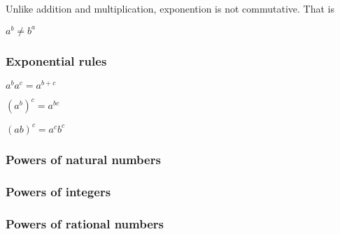 Unlike addition and multiplication, exponention is not commutative. That is

\(a^b\ne b^a\)

\subsubsection{Exponential rules}

\(a^ba^c=a^{b+c}\)

\((a^b)^c=a^{bc}\)

\((ab)^c=a^cb^c\)

\subsubsection{Powers of natural numbers}

\subsubsection{Powers of integers}

\subsubsection{Powers of rational numbers}

